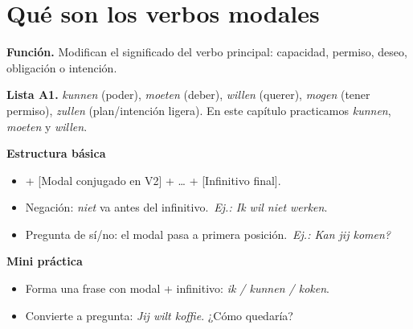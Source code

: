 \section{Qué son los verbos modales}
\textbf{Función.} Modifican el significado del verbo principal: capacidad, permiso, deseo, obligación o intención.

\textbf{Lista A1.} \textit{kunnen} (poder), \textit{moeten} (deber), \textit{willen} (querer), \textit{mogen} (tener permiso), \textit{zullen} (plan/intención ligera). En este capítulo practicamos \textit{kunnen}, \textit{moeten} y \textit{willen}.

\textbf{Estructura básica}
\begin{itemize}[leftmargin=*]
  \item [S] + [Modal conjugado en V2] + \ldots{} + [Infinitivo final].
  \item Negación: \textit{niet} va antes del infinitivo.\ \textit{Ej.: Ik wil niet werken}.
  \item Pregunta de sí/no: el modal pasa a primera posición.\ \textit{Ej.: Kan jij komen?}
\end{itemize}

\textbf{Mini práctica}
\begin{itemize}[leftmargin=*]
  \item Forma una frase con modal + infinitivo: \textit{ik / kunnen / koken}.
  \item Convierte a pregunta: \textit{Jij wilt koffie}. ¿Cómo quedaría?
\end{itemize}
